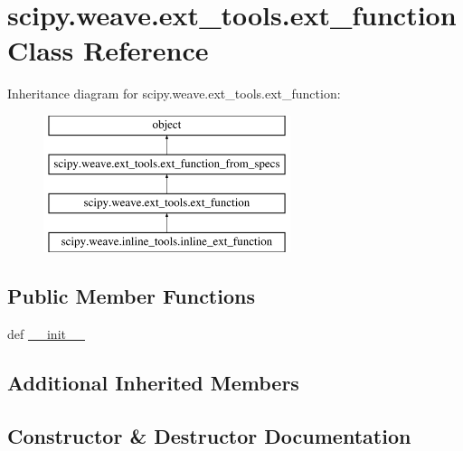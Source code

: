 \hypertarget{classscipy_1_1weave_1_1ext__tools_1_1ext__function}{}\section{scipy.\+weave.\+ext\+\_\+tools.\+ext\+\_\+function Class Reference}
\label{classscipy_1_1weave_1_1ext__tools_1_1ext__function}
Inheritance diagram for scipy.\+weave.\+ext\+\_\+tools.\+ext\+\_\+function\+:\begin{figure}[H]
\begin{center}
\leavevmode
\includegraphics[height=4.000000cm]{classscipy_1_1weave_1_1ext__tools_1_1ext__function}
\end{center}
\end{figure}
\subsection*{Public Member Functions}
\begin{DoxyCompactItemize}
\item 
def \hyperlink{classscipy_1_1weave_1_1ext__tools_1_1ext__function_adac30203d95a3a71d35431afd4868340}{\+\_\+\+\_\+init\+\_\+\+\_\+}
\end{DoxyCompactItemize}
\subsection*{Additional Inherited Members}


\subsection{Constructor \& Destructor Documentation}
\hypertarget{classscipy_1_1weave_1_1ext__tools_1_1ext__function_adac30203d95a3a71d35431afd4868340}{}
